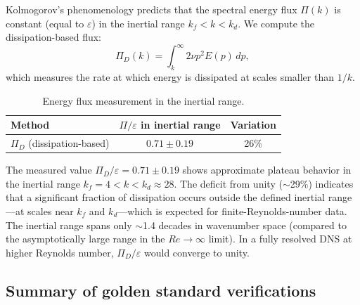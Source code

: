 Kolmogorov's phenomenology predicts that the spectral energy flux $\Pi(k)$ is constant (equal to $\varepsilon$) in the inertial range $k_f < k < k_d$. We compute the dissipation-based flux:
\begin{equation}
\Pi_D(k) = \int_k^\infty 2\nu p^2 E(p)\,dp,
\end{equation}
which measures the rate at which energy is dissipated at scales smaller than $1/k$.

\begin{table}[ht]
\centering \small
\caption{Energy flux measurement in the inertial range.}
\begin{ruledtabular}
\begin{tabular}{lcc}
\hline\hline
Method & $\Pi/\varepsilon$ in inertial range & Variation \\
\hline
$\Pi_D$ (dissipation-based) & $0.71\pm0.19$ & 26\% \\
\hline\hline
\end{tabular}
\end{ruledtabular}
\end{table}

The measured value $\Pi_D/\varepsilon = 0.71\pm 0.19$ shows approximate plateau behavior in the inertial range $k_f=4 < k < k_d\approx 28$. The deficit from unity ($\sim$29\%) indicates that a significant fraction of dissipation occurs outside the defined inertial range---at scales near $k_f$ and $k_d$---which is expected for finite-Reynolds-number data. The inertial range spans only $\sim$1.4 decades in wavenumber space (compared to the asymptotically large range in the $Re\to\infty$ limit). In a fully resolved DNS at higher Reynolds number, $\Pi_D/\varepsilon$ would converge to unity.

\subsection{Summary of golden standard verifications\label{app:golden_summary}}

